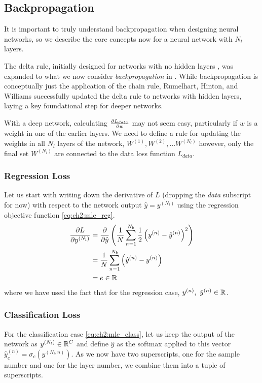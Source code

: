 \subsection{Backpropagation}
It is important to truly understand backpropagation when designing neural
networks, so we describe the core concepts now for a neural network with
$N_l$ layers.

The delta rule, initially designed for networks with no hidden layers
\cite{widrow_neurocomputing:_1988}, was expanded to what we now consider
\emph{backpropagation} in \cite{rumelhart_parallel_1986}. While backpropagation
is conceptually just the application of the chain rule, Rumelhart, Hinton, and
Williams successfully updated the delta rule to networks with hidden layers,
laying a key foundational step for deeper networks.

With a deep network, calculating $\dydx{L_{data}}{w}$ may not seem easy,
particularly if $w$ is a weight in one of the earlier layers. We need
to define a rule for updating the weights in all $N_l$ layers of the network,
$W^{(1)}, W^{(2)}, \ldots W^{(N_l)}$ however, only the final set $W^{(N_l)}$ are
connected to the data loss function $L_{data}$.

\subsubsection{Regression Loss}
Let us start with writing down the derivative of $L$ (dropping the \emph{data}
subscript for now) with respect to the network
output $\hat{y} = y^{(N_l)}$ using the regression objective function \eqref{eq:ch2:mle_reg}.
\begin{align}
  \dydx{L}{y^{(N_l)}} &= \dydx{}{\hat{y}} \left( \frac{1}{N}\sum_{n=1}^{N_b}\frac{1}{2} \left(y^{(n)} - \hat{y}^{(n)}\right)^2\right) \\
                    &= \frac{1}{N}\sum_{n=1}^{N_b} \left(\hat{y}^{(n)} - y^{(n)} \right) \\
                    &= e \in \reals \label{eq:ch2:reg_b1}
\end{align}
where we have used the fact that for the regression case, $y^{(n)},\ \hat{y}^{(n)}
\in \reals$.

\subsubsection{Classification Loss}
For the classification case \eqref{eq:ch2:mle_class}, let us keep the output of
the network as $y^{(N_l)} \in \reals[C]$ and define $\hat{y}$ as the
softmax applied to this vector $\hat{y}^{(n)}_c = \sigma_c\left(y^{(N_l, n)}\right)$.
As we now have two superscripts,
one for the sample number and one for the layer number, we combine them into a
tuple of superscripts.


